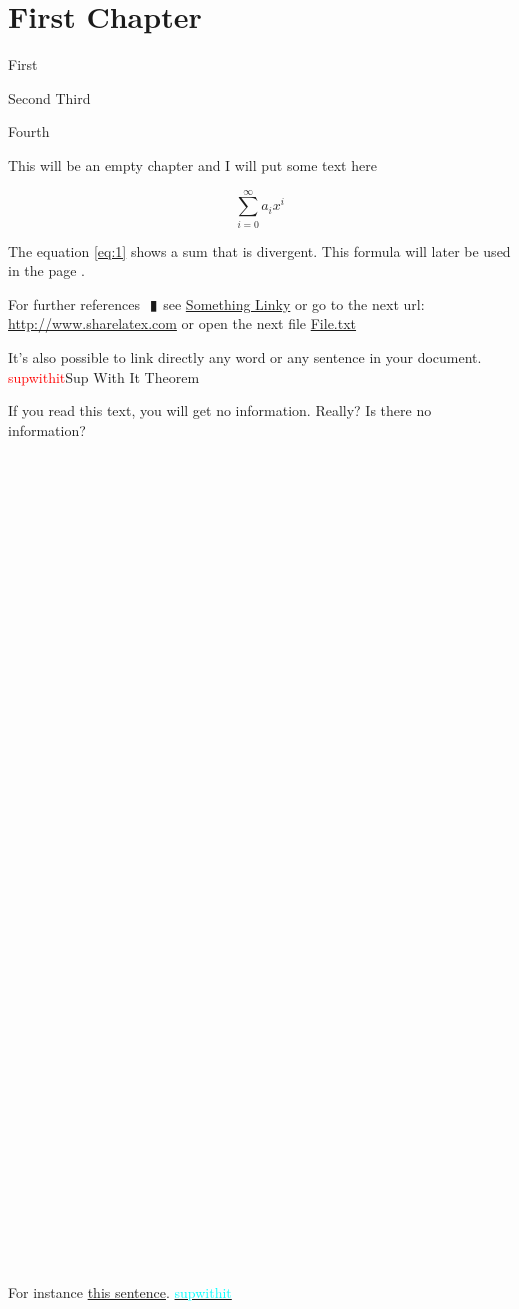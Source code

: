 \documentclass{book}
\newcommand{\df}[1]{\hypertarget{#1}{\textcolor{red}{#1}}}
\newcommand{\rf}[1]{\hyperlink{#1}{\textcolor{cyan}{#1}}}
\newcommand{\pipe}{$\phantom{(}\vrectangleblack\phantom{)}$}
\begin{document}
\chapter{First Chapter}

\begin{enumerate}
  \lit First
  \begin{enumerate}
    \lit Second
    \lit Third
  \end{enumerate}
  \lit Fourth
\end{enumerate}


This will be an empty chapter and I will put some text here

\begin{equation}
\label{eq:1}
\sum_{i=0}^{\infty} a_i x^i
\end{equation}

The equation \ref{eq:1} shows a sum that is divergent. This formula 
will later be used in the page \pageref{second}.

For further references \pipe see \href{http://www.sharelatex.com}{Something 
Linky} or go to the next url: \url{http://www.sharelatex.com} or open 
the next file \href{run:./file.txt}{File.txt}

It's also possible to link directly any word or 
\hypertarget{thesentence}{any sentence} in your document.
\df{supwithit}{Sup With It Theorem}

If you read this text, you will get no information.  Really?  
Is there no information?
\\ \\ \\ \\ \\ \\ \\ \\ \\ \\ \\ \\ \\ \\ \\ \\ \\ \\ \\ \\ \\ \\ \\ \\ \\ \\ \\ \\ \\ \\ \\ \\ \\ \\ \\ \\ \\ \\ \\ \\ \\ \\ \\ \\ 
For instance \hyperlink{thesentence}{this sentence}.
\rf{supwithit}
 
\end{document}
